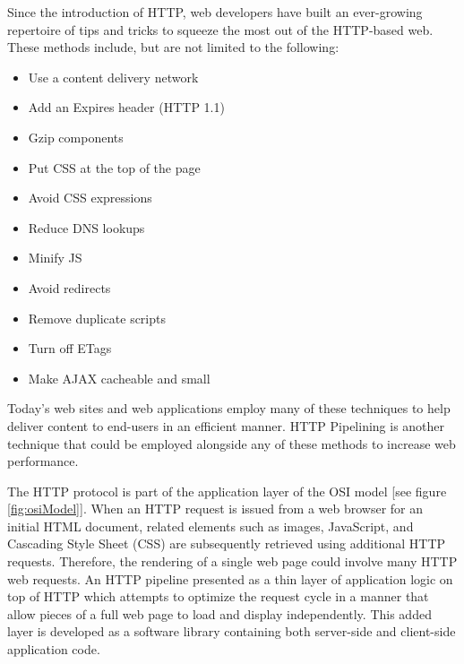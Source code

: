 \documentclass[12pt]{report}
\begin{document}
Since the introduction of HTTP, web developers have built an ever-growing repertoire of tips and tricks to squeeze the most out of the HTTP-based web. These methods include, but are not limited to the following:

\begin{itemize}
	\item Use a content delivery network
	\item Add an Expires header (HTTP 1.1)
	\item Gzip components
	\item Put CSS at the top of the page
	\item Avoid CSS expressions
	\item Reduce DNS lookups
	\item Minify JS
	\item Avoid redirects
	\item Remove duplicate scripts
	\item Turn off ETags
	\item Make AJAX cacheable and small
\end{itemize}

Today's web sites and web applications employ many of these techniques to help deliver content to end-users in an efficient manner. HTTP Pipelining is another technique that could be employed alongside any of these methods to increase web performance.

The HTTP protocol is part of the application layer of the OSI model [see figure \ref{fig:osiModel}].  When an HTTP request is issued from a web browser for an initial HTML document, related elements such as images, JavaScript, and Cascading Style Sheet (CSS) are subsequently retrieved using additional HTTP requests. Therefore, the rendering of a single web page could involve many HTTP web requests. An HTTP pipeline presented as a thin layer of application logic on top of HTTP which attempts to optimize the request cycle in a manner that allow pieces of a full web page to load and display independently.  This added layer is developed as a software library containing both server-side and client-side application code.
\end{document}
